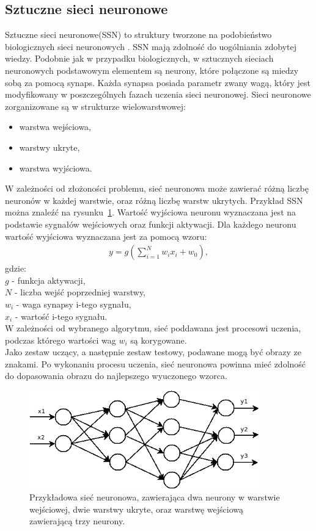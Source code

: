 \subsection{Sztuczne sieci neuronowe}
Sztuczne sieci neuronowe(SSN) to struktury tworzone na podobieństwo biologicznych sieci neuronowych \cite{tadeusiewicz93}. SSN mają zdolność do uogólniania zdobytej wiedzy. Podobnie jak w przypadku biologicznych, w sztucznych sieciach neuronowych podstawowym elementem są neurony, które połączone są miedzy sobą za pomocą synaps. Każda synapsa posiada parametr zwany wagą, który jest modyfikowany w poszczególnych fazach uczenia sieci neuronowej. Sieci neuronowe zorganizowane są w strukturze wielowarstwowej:
\begin{itemize}
  \item warstwa wejściowa,
  \item warstwy ukryte,
  \item warstwa wyjściowa.
\end{itemize}
W zależności od złożoności problemu, sieć neuronowa może zawierać różną liczbę neuronów w każdej warstwie, oraz różną liczbę warstw ukrytych. Przykład SSN można znaleźć na rysunku~\ref{fig:ssn_example}. Wartość wyjściowa neuronu wyznaczana jest na podstawie sygnałów wejściowych oraz funkcji aktywacji. Dla każdego neuronu wartość wyjściowa wyznaczana jest za pomocą wzoru:
\begin{gather*}
  y = g(\sum_{i=1}^{N}w_ix_i+w_0),
\end{gather*}
gdzie:\\
$g$ - funkcja aktywacji,\\
$N$ - liczba wejść poprzedniej warstwy,\\
$w_i$ - waga synapsy i-tego sygnału,\\
$x_i$ - wartość i-tego sygnału.\\
W zależności od wybranego algorytmu, sieć poddawana jest procesowi uczenia, podczas którego wartości wag $w_i$ są korygowane.\\
Jako zestaw uczący, a następnie zestaw testowy, podawane mogą być obrazy ze znakami. Po wykonaniu procesu uczenia, sieć neuronowa powinna mieć zdolność do dopasowania obrazu do najlepszego wyuczonego wzorca. 
\begin{figure}
  \centering
  \includegraphics[width=10cm]{img/ssn-example}
  \caption{Przykładowa sieć neuronowa, zawierająca dwa neurony w warstwie wejściowej, dwie warstwy ukryte, oraz warstwę wejściową zawierającą trzy neurony.}
  \label{fig:ssn_example}
\end{figure}
